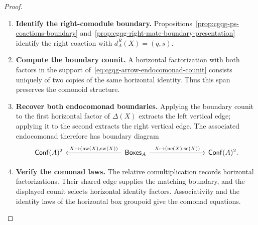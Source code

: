\documentclass[oneside]{article}
\newcommand{\Boxes}{\mathsf{Boxes}}
\newcommand{\Conf}{\mathsf{Conf}}
\newcommand{\boxnw}[1]{\operatorname{nw}(#1)}
\newcommand{\boxne}[1]{\operatorname{ne}(#1)}
\newcommand{\boxsw}[1]{\operatorname{sw}(#1)}
\newcommand{\boxse}[1]{\operatorname{se}(#1)}
\theoremstyle{plain}
\theoremstyle{definition}
\theoremstyle{remark}
\begin{document}
\begin{proof}
    \leavevmode
    \begin{enumerate}[beginpenalty=10000]
        \item \textbf{Identify the right-comodule boundary.} Propositions~\ref{prop:cgqg-ps-coactions-boundary} and~\ref{prop:cgqg-right-mate-boundary-presentation} identify the right coaction with \(d_A^{R}(X)=(q,s)\).

        \item \textbf{Compute the boundary counit.} A horizontal factorization with both factors in the support of~\eqref{eq:cgqg-arrow-endocomonad-counit} consists uniquely of two copies of the same horizontal identity. Thus this span preserves the comonoid structure.

        \item \textbf{Recover both endocomonad boundaries.} Applying the boundary counit to the first horizontal factor of \(\Delta(X)\) extracts the left vertical edge; applying it to the second extracts the right vertical edge. The associated endocomonad therefore has boundary diagram
        \[
        \begin{tikzcd}[column sep=8em]
        \Conf(A)^2 & \Boxes_A
          \arrow[l,"{X\mapsto(\boxnw{X},\boxsw{X})}"']
          \arrow[r,"{X\mapsto(\boxne{X},\boxse{X})}"] & \Conf(A)^2.
        \end{tikzcd}
        \]

        \item \textbf{Verify the comonad laws.} The relative comultiplication records horizontal factorizations. Their shared edge supplies the matching boundary, and the displayed counit selects horizontal identity factors. Associativity and the identity laws of the horizontal box groupoid give the comonad equations. \qedhere
    \end{enumerate}
\end{proof}
\end{document}

